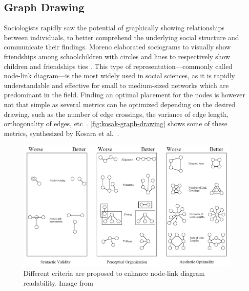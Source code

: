 \subsection{Graph Drawing}

Sociologists rapidly saw the potential of graphically showing relationships between individuals, to better comprehend the underlying social structure and communicate their findings\cite{freemanVisualizingSocialNetworks2000}.
Moreno elaborated sociograms to visually show friendships among schoolchildren with circles and lines to respectively show children and friendships ties \cite{morenoWhoShallSurvive1934}.
This type of representation---commonly called node-link diagram---is the most widely used in social sciences, as it is rapidly understandable and effective for small to medium-sized networks which are predominant in the field.
Finding an optimal placement for the nodes is however not that simple as several metrics can be optimized depending on the desired drawing, such as the number of edge crossings, the variance of edge length, orthogonality of edges, etc~\cite{cristofoliPrincipesUsagesDessins, kosakAutomatingLayoutNetwork1994}. \autoref{fig:kosak-graph-drawing} shows some of these metrics, synthesized by Kosara et al.~\cite{kosakAutomatingLayoutNetwork1994}.
\begin{figure}
    \centering %
    \includegraphics[width=1\textwidth]{static/figures/RelatedWork/Kosak-nodelinkdiagramMetrics}
    \caption{Different criteria are proposed to enhance node-link diagram readability. Image from \cite{kosakAutomatingLayoutNetwork1994}}
    \label{fig:kosak-graph-drawing}
\end{figure}
